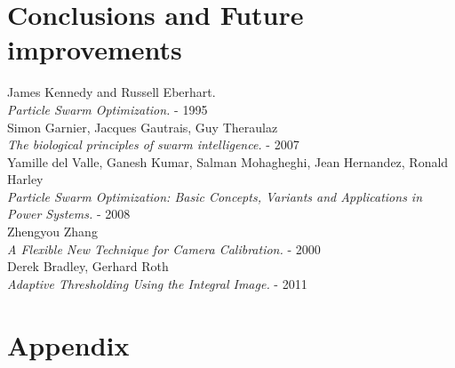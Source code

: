 \documentclass[journal]{IEEEtran}
\begin{document}
\section{Conclusions and Future improvements}




\begin{thebibliography}{1}

  James Kennedy and Russell Eberhart. \\
  \textit{Particle Swarm Optimization.} - 1995
\\
  Simon Garnier, Jacques Gautrais, Guy Theraulaz\\
  \textit{The biological principles of swarm intelligence.} - 2007
\\
  Yamille del Valle, Ganesh Kumar, Salman Mohagheghi, Jean Hernandez, Ronald Harley\\
  \textit{Particle Swarm Optimization: Basic Concepts, Variants and Applications in Power Systems.} - 2008
\\
  Zhengyou Zhang \\
  \textit{A Flexible New Technique for Camera Calibration.} - 2000
\\
  Derek Bradley, Gerhard Roth \\
  \textit{Adaptive Thresholding Using the Integral Image.} - 2011

\end{thebibliography}

\section{Appendix}
\end{document}
